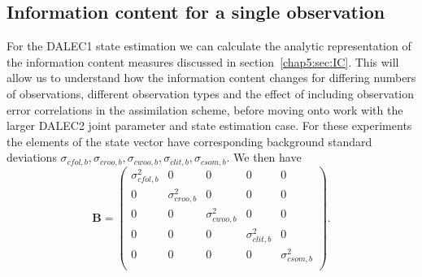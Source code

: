 \subsection{Information content for a single observation} \label{chap5:sec:info_con_single_time}

For the DALEC1 state estimation we can calculate the analytic representation of the information content measures discussed in section~\ref{chap5:sec:IC}. This will allow us to understand how the information content changes for differing numbers of observations, different observation types and the effect of including observation error correlations in the assimilation scheme, before moving onto work with the larger DALEC2 joint parameter and state estimation case. For these experiments the elements of the state vector have corresponding background standard deviations $ \sigma_{cfol, b}, \sigma_{croo, b}, \sigma_{cwoo, b}, \sigma_{clit, b}, \sigma_{csom, b}$. We then have
\begin{equation}
\textbf{B} = \begin{pmatrix} 
\sigma_{cfol,b}^{2} & 0 & 0 & 0 & 0 \\
0 & \sigma_{croo,b}^{2} & 0 & 0 & 0 \\
0 & 0 & \sigma_{cwoo,b}^{2} & 0 & 0 \\
0 & 0 & 0 & \sigma_{clit,b}^{2} & 0 \\
0 & 0 & 0 & 0 & \sigma_{csom,b}^{2} \\
\end{pmatrix}. \label{chap5:eqn:BmatD1}
\end{equation}   


